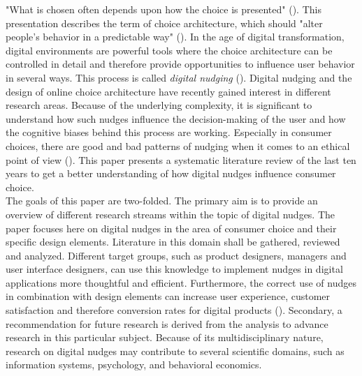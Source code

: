 "What is chosen often depends upon how the choice is presented" (\cite[p.488]{johnson_beyond_2012}). This presentation describes the term of choice architecture, which should "alter people's behavior in a predictable way" (\cite[p.6]{thaler_nudge:_2009}). In the age of digital transformation, digital environments are powerful tools where the choice architecture can be controlled in detail and therefore provide opportunities to influence user behavior in several ways. This process is called \textit{digital nudging} (\cite{weinmann_digital_2016}).
Digital nudging and the design of online choice architecture have recently gained interest in different research areas. Because of the underlying complexity, it is significant to understand how such nudges influence the decision-making of the user and how the cognitive biases behind this process are working. Especially in consumer choices, there are good and bad patterns of nudging when it comes to an ethical point of view (\cite{sunstein_nudging_2015}). This paper presents a systematic literature review of the last ten years to get a better understanding of how digital nudges influence consumer choice. 
\\

The goals of this paper are two-folded. The primary aim is to provide an overview of different research streams within the topic of digital nudges. The paper focuses here on digital nudges in the area of consumer choice and their specific design elements. Literature in this domain shall be gathered, reviewed and analyzed. Different target groups, such as product designers, managers and user interface designers, can use this knowledge to implement nudges in digital applications more thoughtful and efficient. Furthermore, the correct use of nudges in combination with design elements can increase user experience, customer satisfaction and therefore conversion rates for digital products (\cite{conitzer_hide_2012}).
Secondary, a recommendation for future research is derived from the analysis to advance research in this particular subject. Because of its multidisciplinary nature, research on digital nudges may contribute to several scientific domains, such as information systems, psychology, and behavioral economics.
